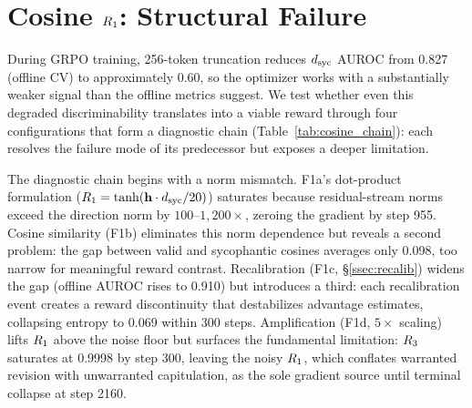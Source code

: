 \section{Cosine \texorpdfstring{$\rone$}{R1}: Structural Failure}
\label{sec:cosine_failure}

During GRPO training, 256-token truncation reduces $d_{\text{syc}}$ AUROC from 0.827 (offline CV) to approximately 0.60, so the optimizer works with a substantially weaker signal than the offline metrics suggest.
We test whether even this degraded discriminability translates into a viable reward through four configurations that form a diagnostic chain (Table~\ref{tab:cosine_chain}): each resolves the failure mode of its predecessor but exposes a deeper limitation.

\begin{table}[t]
\centering
\caption{Cosine $\rone$ failure chain on Qwen3-8B (LoRA rank$=$64, GRPO with $R = w_1 \cdot \rone + w_3 \cdot \rthree$).}
\label{tab:cosine_chain}
\end{table}

The diagnostic chain begins with a norm mismatch.
F1a's dot-product formulation ($R_1 = \tanh(\mathbf{h} \cdot d_{\text{syc}} / 20)$) saturates because residual-stream norms exceed the direction norm by $100$--$1{,}200{\times}$, zeroing the gradient by step 955.
Cosine similarity (F1b) eliminates this norm dependence but reveals a second problem: the gap between valid and sycophantic cosines averages only 0.098, too narrow for meaningful reward contrast.
Recalibration (F1c, \S\ref{ssec:recalib}) widens the gap (offline AUROC rises to 0.910) but introduces a third: each recalibration event creates a reward discontinuity that destabilizes advantage estimates, collapsing entropy to 0.069 within 300 steps.
Amplification (F1d, $5{\times}$ scaling) lifts $\rone$ above the noise floor but surfaces the fundamental limitation: $R_3$ saturates at 0.9998 by step 300, leaving the noisy $\rone$, which conflates warranted revision with unwarranted capitulation, as the sole gradient source until terminal collapse at step 2160.

